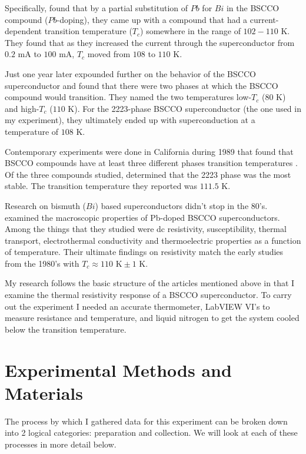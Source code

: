 \documentclass[paper=a4, fontsize=11pt]{scrartcl}
\numberwithin{equation}{section}
\numberwithin{figure}{section}
\numberwithin{table}{section}
\begin{document}
      Specifically, \citet{yanagisawa:1988} found that by a partial substitution of $Pb$ for $Bi$ in the BSCCO compound ($Pb$-doping), they came up with a compound that had a current-dependent transition temperature ($T_c$) somewhere in the range of $102-110$ K. They found that as they increased the current through the superconductor from $0.2$ mA to $100$ mA, $T_c$ moved from $108$ to $110$ K.

      Just one year later \citet{LeePark:1989} expounded further on the behavior of the BSCCO superconductor and found that there were two phases at which the BSCCO compound would transition. They named the two temperatures low-$T_c$ ($80$ K) and high-$T_c$ ($110$ K). For the 2223-phase BSCCO superconductor (the one used in my experiment), they ultimately ended up with superconduction at a temperature of $108$ K.

      Contemporary experiments were done in California during 1989 that found that BSCCO compounds have at least three different phases transition temperatures \citep{Green:1989}. Of the three compounds studied, \citet{Green:1989} determined that the 2223 phase was the most stable. The transition temperature they reported was $111.5$ K.

      Research on bismuth ($Bi$) based superconductors didn't stop in the 80's. \citet{anis:2009} examined the macroscopic properties of Pb-doped BSCCO superconductors. Among the things that they studied were dc resistivity, susceptibility, thermal transport, electrothermal conductivity and thermoelectric properties as a function of temperature. Their ultimate findings on resistivity match the early studies from the 1980's with $T_c \approx 110 \text{ K} \pm 1$ K.

      My research follows the  basic structure of the articles mentioned above in that I examine the thermal resistivity response of a BSCCO superconductor. To carry out the experiment I needed an accurate thermometer, LabVIEW VI's to measure resistance and temperature, and liquid nitrogen to get the system cooled below the transition temperature.

  \section{Experimental Methods and Materials}

      The process by which I gathered data for this experiment can be broken down into 2 logical categories: preparation and collection. We will look at each of these processes in more detail below.
\end{document}
